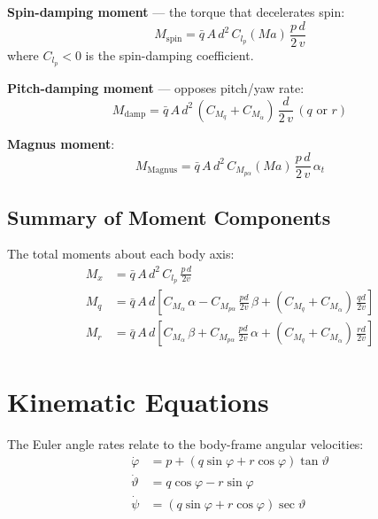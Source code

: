 \documentclass[11pt,twoside,openright]{report}
\newcommand{\Mach}{\mathit{Ma}}
\begin{document}
\textbf{Spin-damping moment} --- the torque that decelerates spin:
\begin{equation}
  M_{\mathrm{spin}} = \bar{q}\,A\,d^2\,C_{l_p}(\Mach)\,\frac{p\,d}{2\,v}
  \label{eq:spin_damping}
\end{equation}
where $C_{l_p} < 0$ is the spin-damping coefficient.

\textbf{Pitch-damping moment} --- opposes pitch/yaw rate:
\begin{equation}
  M_{\mathrm{damp}} = \bar{q}\,A\,d^2\,\left(C_{M_q} + C_{M_{\dot{\alpha}}}\right)\,\frac{d}{2\,v}\,(q \text{ or } r)
  \label{eq:pitch_damping}
\end{equation}

\textbf{Magnus moment}:
\begin{equation}
  M_{\mathrm{Magnus}} = \bar{q}\,A\,d^2\,C_{M_{p\alpha}}(\Mach)\,\frac{p\,d}{2\,v}\,\alpha_t
  \label{eq:magnus_moment}
\end{equation}

\subsection{Summary of Moment Components}

The total moments about each body axis:
\begin{align}
  M_x &= \bar{q}\,A\,d^2\,C_{l_p}\,\frac{p\,d}{2v} \label{eq:Mx}\\
  M_q &= \bar{q}\,A\,d\left[C_{M_\alpha}\,\alpha - C_{M_{p\alpha}}\,\frac{pd}{2v}\,\beta + (C_{M_q}+C_{M_{\dot{\alpha}}})\,\frac{qd}{2v}\right] \label{eq:Mq}\\
  M_r &= \bar{q}\,A\,d\left[C_{M_\alpha}\,\beta + C_{M_{p\alpha}}\,\frac{pd}{2v}\,\alpha + (C_{M_q}+C_{M_{\dot{\alpha}}})\,\frac{rd}{2v}\right] \label{eq:Mr}
\end{align}

\section{Kinematic Equations}

The Euler angle rates relate to the body-frame angular velocities:
\begin{align}
  \dot{\varphi} &= p + (q\sin\varphi + r\cos\varphi)\tan\vartheta \label{eq:kin_phi}\\
  \dot{\vartheta} &= q\cos\varphi - r\sin\varphi \label{eq:kin_theta}\\
  \dot{\psi} &= (q\sin\varphi + r\cos\varphi)\sec\vartheta \label{eq:kin_psi}
\end{align}
\end{document}

